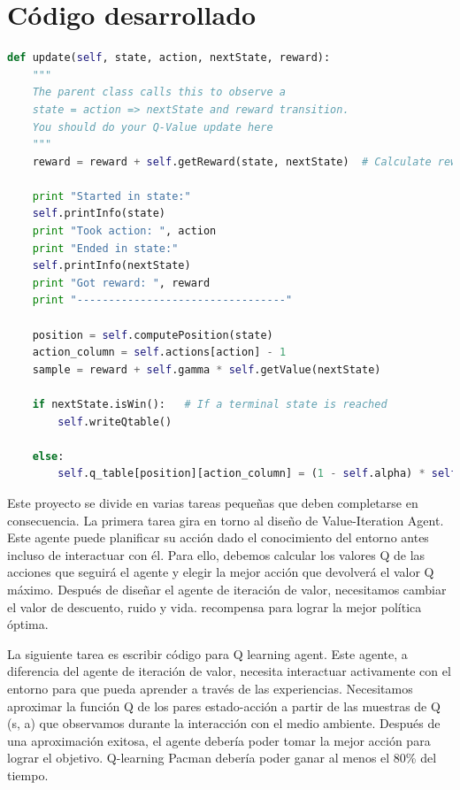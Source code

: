 \documentclass[11pt]{exam}
\begin{document}
\section{Código desarrollado}\label{codigo}

\begin{lstlisting}[language=python, basicstyle=\footnotesize]
def update(self, state, action, nextState, reward):
	"""
	The parent class calls this to observe a
	state = action => nextState and reward transition.
	You should do your Q-Value update here
	"""
	reward = reward + self.getReward(state, nextState)  # Calculate reward
	
	print "Started in state:"
	self.printInfo(state)
	print "Took action: ", action
	print "Ended in state:"
	self.printInfo(nextState)
	print "Got reward: ", reward
	print "---------------------------------"	
	
	position = self.computePosition(state)
	action_column = self.actions[action] - 1
	sample = reward + self.gamma * self.getValue(nextState)
	
	if nextState.isWin():   # If a terminal state is reached
		self.writeQtable()
	
	else:
		self.q_table[position][action_column] = (1 - self.alpha) * self.q_table[position][action_column] + self.alpha * sample
\end{lstlisting}

Este proyecto se divide en varias tareas pequeñas que deben completarse en consecuencia. La primera tarea gira en torno al diseño de Value-Iteration Agent. Este agente puede planificar su acción dado el conocimiento del entorno antes incluso de interactuar con él. Para ello, debemos calcular los valores Q de las acciones que seguirá el agente y elegir la mejor acción que devolverá el valor Q máximo. Después de diseñar el agente de iteración de valor, necesitamos cambiar el valor de descuento, ruido y vida.
recompensa para lograr la mejor política óptima.

La siguiente tarea es escribir código para Q learning agent. Este agente, a diferencia del agente de iteración de valor, necesita interactuar activamente con el entorno para que pueda aprender a través de las experiencias. Necesitamos aproximar la función Q de los pares estado-acción a partir de las muestras de Q (s, a) que observamos durante la interacción con el medio ambiente. Después de una aproximación exitosa, el agente debería poder tomar la mejor acción para lograr el objetivo. Q-learning Pacman debería poder ganar al menos el 80\% del tiempo.
\end{document}
